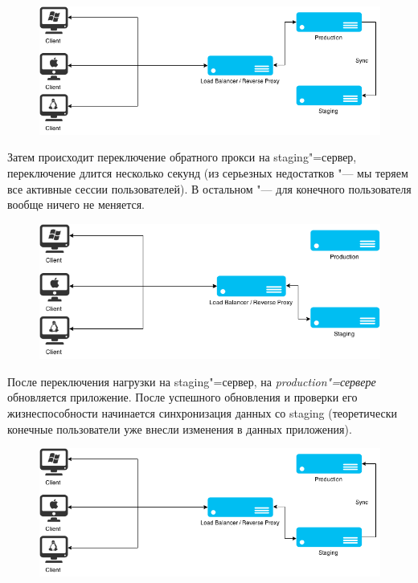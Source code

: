 \documentclass[10pt, a5paper]{article}
\begin{document}
\begin{figure}[h!]
  \centering
  \includegraphics[scale=0.35]{02_2015_04_sync_to_stage}
\end{figure}

Затем происходит переключение обратного прокси на staging"=сервер, переключение длится несколько секунд (из серьезных недостатков "--- мы теряем все активные сессии пользователей). В остальном "--- для конечного пользователя вообще ничего не меняется.

\begin{figure}[h!]
  \centering
  \includegraphics[scale=0.35]{02_2015_05_work_on_stage}
\end{figure}

После переключения нагрузки на staging"=сервер, на \emph{production"=сервере} обновляется приложение. После успешного обновления и проверки его жизнеспособности начинается синхронизация данных со staging (теоретически конечные пользователи уже внесли изменения в данных приложения).

\begin{figure}[h!]
  \centering
  \includegraphics[scale=0.35]{02_2015_06_sync_to_prod}
\end{figure}
\end{document}
